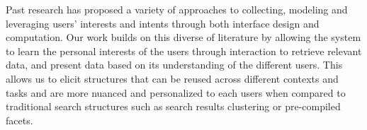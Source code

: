 Past research has proposed a variety of approaches to collecting, modeling and leveraging users' interests and intents through both interface design and computation. Our work builds on this diverse of literature by allowing the system to learn the personal interests of the users through interaction to retrieve relevant data, and present data based on its understanding of the different users. This allows us to elicit structures that can be reused across different contexts and tasks and are more nuanced and personalized to each users when compared to traditional search structures such as search results clustering or pre-compiled facets.




